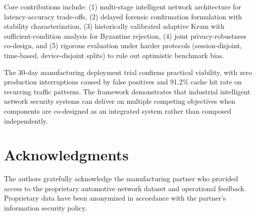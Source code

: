 \documentclass[preprint,12pt]{elsarticle}
\begin{document}
Core contributions include: (1) multi-stage intelligent network architecture for latency-accuracy trade-offs, (2) delayed forensic confirmation formulation with stability characterization, (3) historically calibrated adaptive Krum with sufficient-condition analysis for Byzantine rejection, (4) joint privacy-robustness co-design, and (5) rigorous evaluation under harder protocols (session-disjoint, time-based, device-disjoint splits) to rule out optimistic benchmark bias.

The 30-day manufacturing deployment trial confirms practical viability, with zero production interruptions caused by false positives and 91.2\% cache hit rate on recurring traffic patterns. The framework demonstrates that industrial intelligent network security systems can deliver on multiple competing objectives when components are co-designed as an integrated system rather than composed independently.

\section*{Acknowledgments}

The authors gratefully acknowledge the manufacturing partner who provided access to the proprietary automotive network dataset and operational feedback. Proprietary data have been anonymized in accordance with the partner's information security policy.
\end{document}
